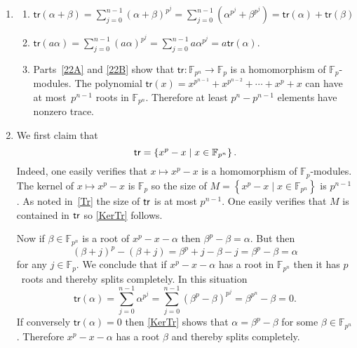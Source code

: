 \documentclass[12pt]{article}
\let\ker\relax\DeclareMathOperator{\ker}{\mathsf{ker}}
\begin{document}
\begin{enumerate}
\item\label{Tr} %
\begin{enumerate}
\item\label{22A} $\mathsf{tr}\left(\alpha+\beta\right)
=\sum_{j=0}^{n-1}\left(\alpha+\beta\right)^{p^j}
=\sum_{j=0}^{n-1}\left(\alpha^{p^j}+\beta^{p^j}\right)
=\mathsf{tr}\left(\alpha\right)+\mathsf{tr}\left(\beta\right)$
\item\label{22B} $\mathsf{tr}\left(a\alpha\right)
=\sum_{j=0}^{n-1}\left(a\alpha\right)^{p^j}
=\sum_{j=0}^{n-1}a\alpha^{p^j}=a\mathsf{tr}\left(\alpha\right)$.
\item Parts~\autoref{22A} and \autoref{22B} show
that $\mathsf{tr}:\mathbb{F}_{p^n}\to\mathbb{F}_p$
is a homomorphism of $\mathbb{F}_p$-modules.
The polynomial $\mathsf{tr}\left(x\right)
=x^{p^{n-1}}+x^{p^{n-2}}+\cdots+x^p+x$ can have
at most~$p^{n-1}$ roots in $\mathbb{F}_{p^n}$.
Therefore at least $p^n-p^{n-1}$ elements have nonzero trace.
\end{enumerate}

\item %
We first claim that
\begin{equation}\label{KerTr}
\ker\mathsf{tr}
=\left\{x^p-x\mid x\in \mathbb{F}_{p^n}\right\}.
\end{equation}
Indeed, one easily verifies
that $x\mapsto x^p-x$ is a homomorphism
of $\mathbb{F}_p$-modules. The kernel of $x\mapsto x^p-x$
is $\mathbb{F}_p$ so the size of
$M=\left\{x^p-x\mid x\in \mathbb{F}_{p^n}\right\}$ is $p^{n-1}$.
As noted in~\autoref{Tr}
the size of $\ker\mathsf{tr}$ is at most $p^{n-1}$.
One easily verifies that $M$ is contained in $\ker\mathsf{tr}$
so \autoref{KerTr} follows.

Now if $\beta\in\mathbb{F}_{p^n}$
is a root of $x^p-x-\alpha$ then $\beta^p-\beta=\alpha$. But then
\[\left(\beta+j\right)^p-\left(\beta+j\right)
=\beta^p+j-\beta-j=\beta^p-\beta=\alpha\]
for any $j\in\mathbb{F}_p$. We conclude that
if $x^p-x-\alpha$ has a root in $\mathbb{F}_{p^n}$
then it has $p$~roots and thereby splits completely.
In this situation
\[\mathsf{tr}\left(\alpha\right)
=\sum_{j=0}^{n-1}\alpha^{p^j}
=\sum_{j=0}^{n-1}\left(\beta^p-\beta\right)^{p^j}
=\beta^{p^n}-\beta=0.\]
If conversely $\mathsf{tr}\left(\alpha\right)=0$
then \autoref{KerTr} shows that $\alpha=\beta^p-\beta$
for some $\beta\in\mathbb{F}_{p^n}$. Therefore $x^p-x-\alpha$
has a root $\beta$ and thereby splits completely.

\end{enumerate}
\end{document}
